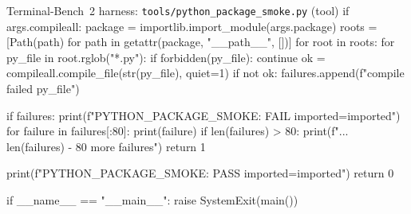 \documentclass{llmxive}
\begin{document}
\begin{promptbox}{Terminal-Bench~2 harness: \texttt{tools/python\_package\_smoke.py} (tool)}
    if args.compileall:
        package = importlib.import_module(args.package)
        roots = [Path(path) for path in getattr(package, "__path__", [])]
        for root in roots:
            for py_file in root.rglob("*.py"):
                if forbidden(py_file):
                    continue
                ok = compileall.compile_file(str(py_file), quiet=1)
                if not ok:
                    failures.append(f"compile failed {py_file}")

    if failures:
        print(f"PYTHON_PACKAGE_SMOKE: FAIL imported={imported}")
        for failure in failures[:80]:
            print(failure)
        if len(failures) > 80:
            print(f"... {len(failures) - 80} more failures")
        return 1

    print(f"PYTHON_PACKAGE_SMOKE: PASS imported={imported}")
    return 0


if __name__ == "__main__":
    raise SystemExit(main())
\end{promptbox}
\end{document}
